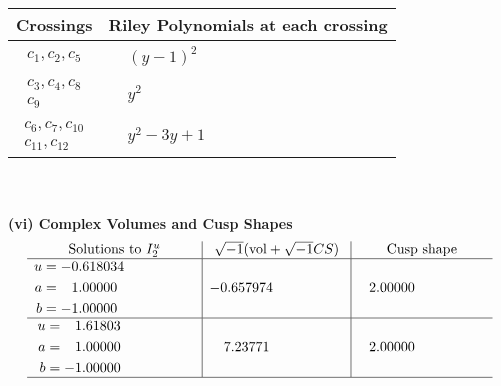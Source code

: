 \documentclass[1p]{elsarticle_modified}
\theoremstyle{definition}
\newcommand{\I}{\sqrt{-1}}
\begin{document}
\begin{tabular}{m{50pt}|m{274pt}}
Crossings & \hspace{64pt}Riley Polynomials at each crossing \\
\hline $$\begin{aligned}c_{1},c_{2},c_{5}\end{aligned}$$&$\begin{aligned}
&(y-1)^2
\end{aligned}$\\
\hline $$\begin{aligned}c_{3},c_{4},c_{8}\\c_{9}\end{aligned}$$&$\begin{aligned}
&y^2
\end{aligned}$\\
\hline $$\begin{aligned}c_{6},c_{7},c_{10}\\c_{11},c_{12}\end{aligned}$$&$\begin{aligned}
&y^2-3 y+1
\end{aligned}$\\
\hline
\end{tabular}\\~\\
\newpage\flushleft \textbf{(vi) Complex Volumes and Cusp Shapes}
$$\begin{array}{c|c|c}  
\text{Solutions to }I^u_{2}& \I (\text{vol} + \sqrt{-1}CS) & \text{Cusp shape}\\
 \hline 
\begin{aligned}
u &= -0.618034\phantom{ +0.000000I} \\
a &= \phantom{-}1.00000\phantom{ +0.000000I} \\
b &= -1.00000\phantom{ +0.000000I}\end{aligned}
 & -0.657974\phantom{ +0.000000I} & \phantom{-}2.00000\phantom{ +0.000000I} \\ \hline\begin{aligned}
u &= \phantom{-}1.61803\phantom{ +0.000000I} \\
a &= \phantom{-}1.00000\phantom{ +0.000000I} \\
b &= -1.00000\phantom{ +0.000000I}\end{aligned}
 & \phantom{-}7.23771\phantom{ +0.000000I} & \phantom{-}2.00000\phantom{ +0.000000I}\\
 \hline 
 \end{array}$$\newpage\newpage\renewcommand{\arraystretch}{1}
\end{document}
